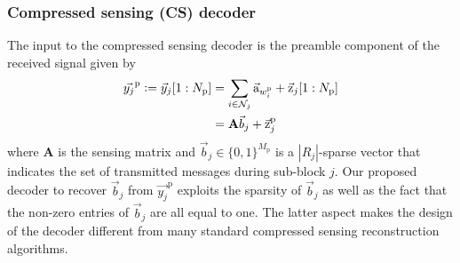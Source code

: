 \subsubsection{Compressed sensing (CS) decoder}
\label{sec:CS_decoder}
The input to the compressed sensing decoder is the preamble component of the received signal given by
\begin{align}
\vec{y_{j}}^{\mathrm{p}}\mathrel{\mathop:}= \vec{y}_{j}[1:N_{\mathrm{p}}]&=\sum_{i\in\mathcal{N}_j} \vec{\mathrm{a}}_{w^{\mathrm{p}}_i}+\vec{\mathrm{z}}_{j}[1:N_{\mathrm{p}}]\\
&= \mathbf{A}\vec{b}_j+\vec{\mathrm{z}}_{j}^{\mathrm{p}}\label{eqn:preamble_receivedsignal}
\end{align}
where $\mathbf{A}$ is the sensing matrix and $\vec{b}_j \in \{0,1\}^{M_\mathrm{p}}$ is a $|R_j|$-sparse vector that indicates the set of transmitted messages during sub-block $j$. Our proposed decoder to recover $\vec{b}_j$ from $\vec{y_{j}}^{\mathrm{p}}$ exploits the sparsity of $\vec{b}_j$ as well as the fact that the non-zero entries of $\vec{b}_j$ are all equal to one. The latter aspect makes the design of the decoder different from many standard compressed sensing reconstruction algorithms.

